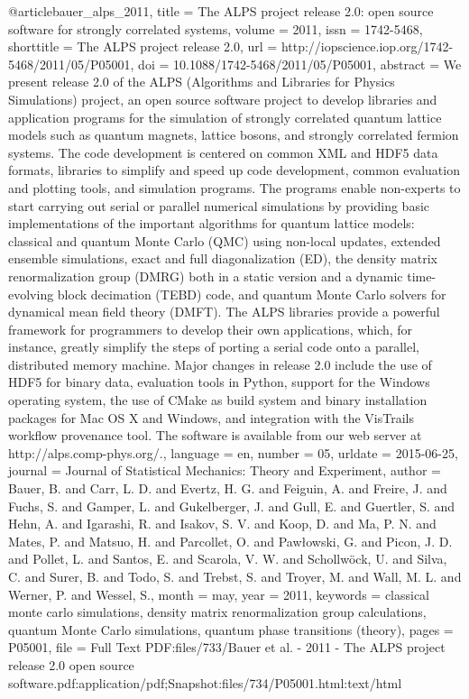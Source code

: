 @article{bauer_alps_2011,
    title = {The {ALPS} project release 2.0: open source software for strongly correlated systems},
    volume = {2011},
    issn = {1742-5468},
    shorttitle = {The {ALPS} project release 2.0},
    url = {http://iopscience.iop.org/1742-5468/2011/05/P05001},
    doi = {10.1088/1742-5468/2011/05/P05001},
    abstract = {We present release 2.0 of the ALPS (Algorithms and Libraries for Physics Simulations)     project, an open source software project to develop libraries and application programs for the simulation of strongly correlated quantum lattice models such as quantum magnets, lattice bosons, and strongly       correlated fermion systems. The code development is centered on common XML and HDF5 data formats,         libraries to simplify and speed up code development, common evaluation and plotting tools, and simulation programs. The programs enable non-experts to start carrying out serial or parallel numerical simulations  by providing basic implementations of the important algorithms for quantum lattice models: classical and  quantum Monte Carlo (QMC) using non-local updates, extended ensemble simulations, exact and full          diagonalization (ED), the density matrix renormalization group (DMRG) both in a static version and a      dynamic time-evolving block decimation (TEBD) code, and quantum Monte Carlo solvers for dynamical mean    field theory (DMFT). The ALPS libraries provide a powerful framework for programmers to develop their own applications, which, for instance, greatly simplify the steps of porting a serial code onto a parallel,   distributed memory machine. Major changes in release 2.0 include the use of HDF5 for binary data,         evaluation tools in Python, support for the Windows operating system, the use of CMake as build system    and binary installation packages for Mac OS X and Windows, and integration with the VisTrails workflow    provenance tool. The software is available from our web server at http://alps.comp-phys.org/.},
    language = {en},
    number = {05}, 
    urldate = {2015-06-25},
    journal = {Journal of Statistical Mechanics: Theory and Experiment},
    author = {Bauer, B. and Carr, L. D. and Evertz, H. G. and Feiguin, A. and Freire, J. and Fuchs, S.    and Gamper, L. and Gukelberger, J. and Gull, E. and Guertler, S. and Hehn, A. and Igarashi, R. and        Isakov, S. V. and Koop, D. and Ma, P. N. and Mates, P. and Matsuo, H. and Parcollet, O. and Pawłowski, G. and Picon, J. D. and Pollet, L. and Santos, E. and Scarola, V. W. and Schollwöck, U. and Silva, C. and    Surer, B. and Todo, S. and Trebst, S. and Troyer, M. and Wall, M. L. and Werner, P. and Wessel, S.},
    month = may,
    year = {2011},
    keywords = {classical monte carlo simulations, density matrix renormalization group calculations,     quantum Monte Carlo simulations, quantum phase transitions (theory)},
    pages = {P05001},
    file = {Full Text PDF:files/733/Bauer et al. - 2011 - The ALPS project release 2.0 open source        software.pdf:application/pdf;Snapshot:files/734/P05001.html:text/html}
}

